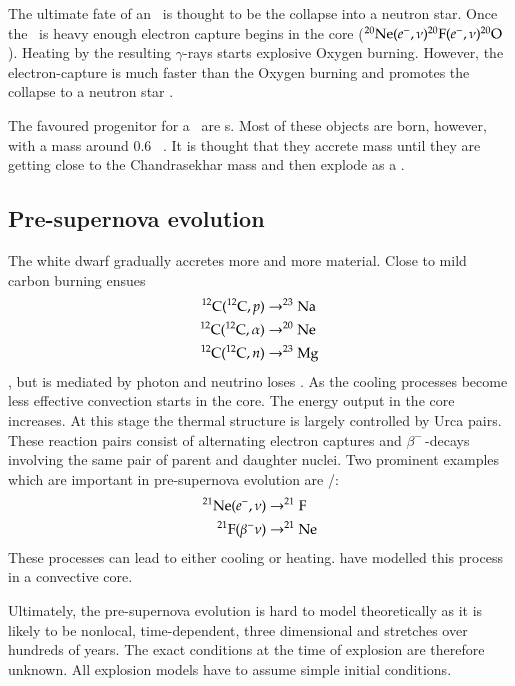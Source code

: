 The ultimate fate of an \onemgwd\ is thought to be the collapse into a neutron star. Once the \onemgwd\ is heavy enough electron capture begins in the core ($\Ne(e^-,\nu)\F[20](e^-,\nu)\Ox[20]$). Heating by the resulting $\gamma$-rays starts explosive Oxygen burning. However, the electron-capture is much faster than the Oxygen burning and promotes the collapse to a neutron star \citep{1991ApJ...367L..19N, 2005A&A...435..231G}. 

The favoured progenitor for a \snia\  are \cowd s. Most of these objects are born, however, with a mass around 0.6 \msun\ \citep{2007MNRAS.375.1315K}. It is thought that they accrete mass until they are getting close to the Chandrasekhar mass and then explode as a \snia.

\subsection{Pre-supernova evolution}
The white dwarf gradually accretes more and more material. Close to \mchan mild carbon burning ensues
\begin{align}
\nonumber
\Carb(\Carb,p) &\rightarrow \Na \\  \nonumber
\Carb(\Carb,\alpha) &\rightarrow \Ne \\ 
\Carb(\Carb,n) &\rightarrow \Mg[23]
\end{align},
but is mediated by photon and neutrino loses \citep{2005NuPhA.758..463L, 2007nps..book.....I}. As the cooling processes become less effective convection starts in the core. The energy output in the core increases. At this stage the thermal structure is largely controlled by Urca pairs. These reaction pairs consist of alternating electron captures and $\beta^-$\,-decays involving the same pair of parent and daughter nuclei. Two prominent examples which are important in pre-supernova evolution are \Ne[21]/\F[21]:
\begin{align}
\nonumber
\Ne[21](e^-, \nu) &\rightarrow \F[21] \\
\F[21](\beta^- \nu) &\rightarrow \Ne[21]
\end{align}
These processes can lead to either cooling or heating. \cite{2005NuPhA.758..463L} have modelled this process in a convective core. 

Ultimately, the pre-supernova evolution is hard to model theoretically as it is likely to be nonlocal, time-dependent, three dimensional and stretches over hundreds of years. The exact conditions at the time of explosion are therefore unknown. All explosion models have to assume simple initial conditions. 

